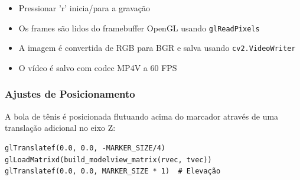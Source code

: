 \begin{itemize}
    \item Pressionar 'r' inicia/para a gravação
    \item Os frames são lidos do framebuffer OpenGL usando \texttt{glReadPixels}
    \item A imagem é convertida de RGB para BGR e salva usando \texttt{cv2.VideoWriter}
    \item O vídeo é salvo com codec MP4V a 60 FPS
\end{itemize}

\subsubsection{Ajustes de Posicionamento}

A bola de tênis é posicionada flutuando acima do marcador através de uma translação adicional no eixo Z:

\begin{lstlisting}[caption=Posicionamento da bola]
glTranslatef(0.0, 0.0, -MARKER_SIZE/4)
glLoadMatrixd(build_modelview_matrix(rvec, tvec))
glTranslatef(0.0, 0.0, MARKER_SIZE * 1)  # Elevação
\end{lstlisting}
